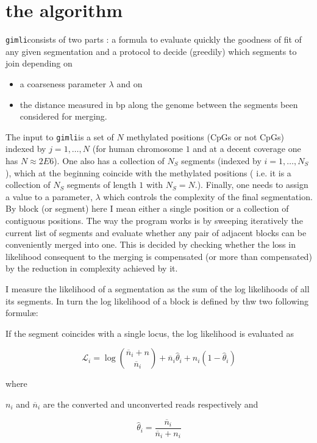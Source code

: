 \documentclass[11pt]{amsart}
\newcommand{\lik}{\ensuremath{\mathcal{L}}}
\newcommand{\gimli}{\texttt{gimli}}
\begin{document}
\section{the algorithm}

\gimli consists of two parts : 
a formula to evaluate quickly the 
goodness of fit of any given segmentation
and a protocol to decide (greedily) which  segments to join depending on
\begin{itemize}
\item{}a coarseness parameter $\lambda$ and on 
\item{}the distance measured in bp along
the genome between the segments been considered for merging. 
\end{itemize}





The  input to \gimli is a set of $N$ methylated positions 
(CpGs or not CpGs) indexed by $j=1,\dots,N$ 
(for human chromosome $1$ and at a 
decent coverage one has $N \approx 2E6$).
One also has a collection of $N_S$ 
segments (indexed by $i=1,\dots,N_S$), 
which at the beginning
coincide with the methylated positions ( i.e. it is a collection of $N_S$ 
segments of length $1$ with $N_S=N$.).
Finally, one needs to assign a value to a parameter, $\lambda$ which controls the 
complexity of the final segmentation.
By block (or segment) here I mean either a single position or a collection
of contiguous positions. 
The way the program works is by sweeping
iteratively the current list of segments and evaluate whether any pair 
of adjacent blocks can be conveniently merged into one.  
This is decided by checking whether the loss in 
likelihood consequent to the merging is compensated (or more than compensated)
by the reduction in complexity achieved by it.


I measure the likelihood of a segmentation as the sum of the log likelihoods
of all its segments. In turn the log likelihood of a block is defined by thw
two following formul\ae:

If the
segment coincides with a single locus, 
the log likelihood  is evaluated as 

\[\lik_i=\log {\overline{n}_i+n \choose \overline{n}_i} +
	{\overline{n}_i}\hat{\theta}_i+
	n_i(1-\hat{\theta}_i)
\]\label{loglik}

where

$n_i$ and $\overline{n}_i$ are the converted and unconverted reads respectively 
and

\[\hat{\theta}_i=\frac{\overline{n}_i}{\overline{n}_i+n_i}\]
\end{document}
